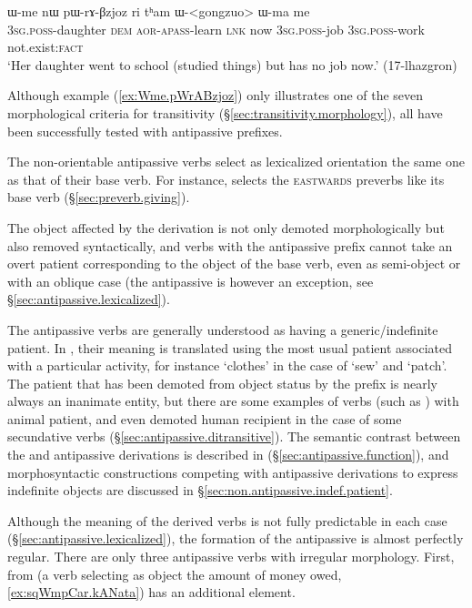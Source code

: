\begin{exe}
\ex \label{ex:Wme.pWrABzjoz}
\gll ɯ-me nɯ pɯ-rɤ-βzjoz ri tʰam ɯ-<gongzuo> ɯ-ma me \\
\textsc{3sg}.\textsc{poss}-daughter \textsc{dem} \textsc{aor}-\textsc{apass}-learn \textsc{lnk} now \textsc{3sg}.\textsc{poss}-job \textsc{3sg}.\textsc{poss}-work not.exist:\textsc{fact} \\
\glt `Her daughter went to school (studied things) but has no job now.' (17-lhazgron)
\end{exe}

Although example (\ref{ex:Wme.pWrABzjoz}) only illustrates one of the seven morphological criteria for transitivity (§\ref{sec:transitivity.morphology}), all have been successfully tested with antipassive prefixes.

The non-orientable antipassive verbs select as lexicalized orientation the same one as that of their base verb. For instance,  selects the \textsc{eastwards} preverbs like its base verb  (§\ref{sec:preverb.giving}).

The object affected by the  derivation is not only demoted morphologically but also removed syntactically, and verbs with the antipassive prefix cannot take an overt patient corresponding to the object of the base verb, even as semi-object or with an oblique case (the antipassive  is however an exception, see §\ref{sec:antipassive.lexicalized}).

The antipassive verbs are generally understood as having a generic/indefinite patient. In , their meaning is translated using the most usual patient associated with a particular activity, for instance `clothes' in the case of  `sew' and  `patch'.  The patient that has been demoted from object status by the  prefix is nearly always an inanimate entity, but there are some examples of verbs (such as ) with animal patient, and even demoted human recipient in the case of some secundative verbs (§\ref{sec:antipassive.ditransitive}). The semantic contrast between the  and  antipassive derivations is described in (§\ref{sec:antipassive.function}), and morphosyntactic constructions competing with antipassive derivations to express indefinite objects are discussed in §\ref{sec:non.antipassive.indef.patient}.


Although the meaning of the derived verbs is not fully predictable in each case (§\ref{sec:antipassive.lexicalized}), the formation of the  antipassive is almost perfectly regular. There are only three  antipassive verbs with irregular morphology. First,   from   (a verb selecting as object the amount of money owed, \ref{ex:sqWmpCar.kANata}) has an additional  element. 

